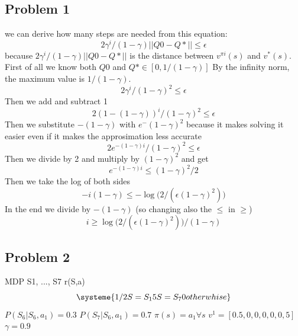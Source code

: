 \documentclass[10pt,a4paper]{article}
\begin{document}
\subsection*{Problem 1}
we can derive how many steps are needed from this equation:
\begin{equation}  {2\gamma^i}/{(1-\gamma)}||Q0-Q*|| \leq \epsilon \end{equation}
because $ {2\gamma^i}/{(1-\gamma)}||Q0-Q*|| $ is the distance between $ v^{\pi i}(s) $ and $v^*(s) $. \newline
\newline
First of all we know both $Q0$ and $Q* \in [0, 1/(1-\gamma)]$ By the infinity norm, the maximum value is $ 1/(1-\gamma) $. 
\begin{equation}
{2\gamma^i}/{(1-\gamma)^2} \leq \epsilon
\end{equation}
Then we add and subtract 1 
\begin{equation}
    {2 (1 - (1 - \gamma))^i}/{(1-\gamma)^2} \leq \epsilon
\end{equation}
Then we substitute $ - (1 - \gamma) $ with $e^- (1 - \gamma)^2 $ because it makes solving it easier even if it makes the approsimation less accurate
\begin{equation}
    {2e^{-(1 - \gamma )i}}/{(1-\gamma)^2} \leq \epsilon
\end{equation}
Then we divide by 2 and multiply by $ {(1-\gamma)^2} $ and get 
\begin{equation}
e^{-(1 - \gamma )i} \leq  {(1-\gamma)^2}/2
\end{equation}
Then we take the log of both sides 
\begin{equation}
    -i(1 - \gamma ) \leq  -\log({2/(\epsilon(1-\gamma)^2))}
\end{equation}
In the end we divide by $ -(1 - \gamma ) $ (so changing also the $\leq$ in $\geq$)
\begin{equation}
    i \geq  \log({2/(\epsilon(1-\gamma)^2))}/(1 - \gamma ) 
\end{equation}

\newpage
\subsection*{Problem 2}
MDP \newline
S1, ..., S7
r(S,a)\begin{equation}
    \systeme{
      1/2 S = S_{1}
      5 S = S_{7}
      0 otherwhise
    }
\end{equation}
\newline
$P(S_{6}|S_{6},a_{1}) = 0.3 $
$P(S_{7}|S_{6},a_{1}) = 0.7 $
\newline
$\pi(s) = a_{1} \forall s $
$v^1 = [0.5, 0, 0, 0, 0, 0, 5] $
$\gamma = 0.9 $
\end{document}

